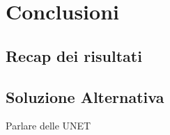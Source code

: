 
\chapter{Conclusioni}

\section{Recap dei risultati}


\section{Soluzione Alternativa}
Parlare delle UNET

